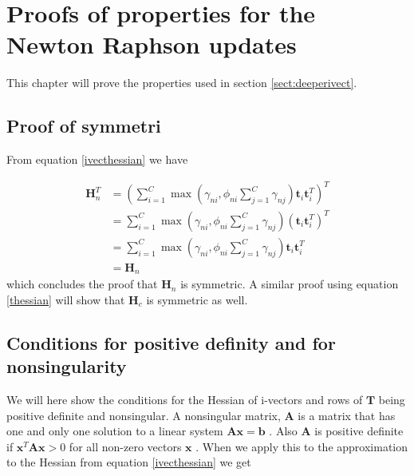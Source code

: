 \chapter{Proofs of properties for the Newton Raphson updates}

This chapter will prove the properties used in section \ref{sect:deeperivect}. 


\section{Proof of symmetri}
\label{symproof}

From equation \ref{ivecthessian} we have

\begin{align*}
\mathbf{H}_n^T &= \left(\sum_{i=1}^{C}\max(\gamma_{ni}, \phi_{ni}\sum_{j=1}^{C}\gamma_{nj})\mathbf{t}_i\mathbf{t}_i^T\right)^T \\
 &= \sum_{i=1}^{C}\max(\gamma_{ni}, \phi_{ni}\sum_{j=1}^{C}\gamma_{nj})\left(\mathbf{t}_i\mathbf{t}_i^T\right)^T \\
 &= \sum_{i=1}^{C}\max(\gamma_{ni}, \phi_{ni}\sum_{j=1}^{C}\gamma_{nj})\mathbf{t}_i\mathbf{t}_i^T \\
 &= \mathbf{H}_n
\end{align*}
which concludes the proof that $\mathbf{H}_n$ is symmetric. A similar proof using equation \ref{thessian} will show that $\mathbf{H}_c$ is symmetric as well.




\section{Conditions for positive definity and for nonsingularity}
\label{posdefproof}
We will here show the conditions for the Hessian of i-vectors and rows of $\mathbf{T}$ being positive definite and nonsingular. A nonsingular matrix, $\mathbf{A}$ is a matrix that has one and only one solution to a linear system $\mathbf{Ax}=\mathbf{b}$ \cite[p. 54]{matte3}. Also $\mathbf{A}$ is positive definite if $\mathbf{x}^T\mathbf{Ax} > 0$ for all non-zero vectors $\mathbf{x}$ \cite[p. 246]{matte3}. When we apply this to the approximation to the Hessian from equation \ref{ivecthessian} we get

